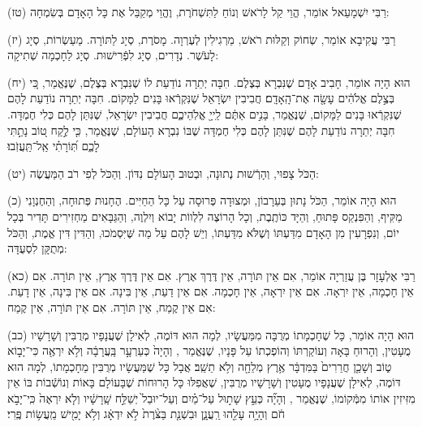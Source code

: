 \documentclass[twoside, openany, parskip=half, 11pt]{book}
\begin{document}
(טז)
רַבִּי יִשְׁמָעֵאל אוֹמֵר, הֱוֵי קַל לָרֹאשׁ וְנוֹחַ לַתִּשְׁחֹרֶת, וֶהֱוֵי מְקַבֵּל אֶת כָּל הָאָדָם בְּשִׂמְחָה:

(יז)
רַבִּי עֲקִיבָא אוֹמֵר, שְׂחוֹק וְקַלּוּת רֹאשׁ, מֵרְגִילִין לְעֶרְוָה.
מָסֹרֶת, סְיָג לַתּוֹרָה.
מַעַשְׂרוֹת, סְיָג לָעֹשֶׁר.
נְדָרִים, סְיָג לִפְֿרִישׁוּת.
סְיָג לַחָכְמָה שְׁתִיקָה:

(יח)
הוּא הָיָה אוֹמֵר, חָבִיב אָדָם שֶׁנִּבְרָא בְּצֶלֶם.
חִבָּה יְתֵרָה נוֹדַעַת לוֹ שֶׁנִּבְרָא בְּצֶלֶם, שֶׁנֶּאֱמַר, כִּ֚י בְּצֶ֣לֶם אֱלֹהִ֔ים עָשָׂ֖ה אֶת־הָֽאָדָֽם׃
חֲבִיבִין יִשְׂרָאֵל שֶׁנִּקְרְֿאוּ בָּנִים לַמָּקוֹם.
חִבָּה יְתֵרָה נוֹדַעַת לָהֶם שֶׁנִּקְרְֿאוּ בָּנִים לַמָּקוֹם, שֶׁנֶּאֱמַר, בָּנִ֣ים אַתֶּ֔ם לַֽייָ֖ אֱלֹֽהֵיכֶ֑ם
חֲבִיבִין יִשְׂרָאֵל, שֶׁנִּתַּן לָהֶם כְּלִי חֶמְדָּה.
חִבָּה יְתֵרָה נוֹדַעַת לָהֶם שֶׁנִּתַּן לָהֶם כְּלִי חֶמְדָּה שֶׁבּוֹ נִבְרָא הָעוֹלָם, שֶׁנֶּאֱמַר, כִּ֤י לֶ֣קַח ט֭וֹב נָתַ֣תִּי לָכֶ֑ם תּֽ֝וֹרָתִ֗י אַֽל־תַּֽעֲזֹֽבוּ׃

(יט)
הַכֹּל צָפוּי, וְהָרְֿשׁוּת נְתוּנָה, וּבְטוּב הָעוֹלָם נִדּוֹן.
וְהַכֹּל לְפִי רֹב הַמַּעֲשֶׂה:

(כ)
הוּא הָיָה אוֹמֵר, הַכֹּל נָתוּן בְּעֵרָבוֹן, וּמְצוּדָה פְּרוּסָה עַל כָּל הַחַיִּים.
הֶחָנוּת פְּתוּחָה, וְהַחֶנְוָנִי מַקִּיף, וְהַפִּנְקֵס פָּתוּחַ, וְהַיָּד כּוֹתֶֽבֶת, וְכָל הָרוֹצֶה לִלְווֹת יָבוֹא וְיִלְוֶה, וְהַגַּבָּאִים מַחְזִירִים תָּדִיר בְּכָל יוֹם, וְנִפְרָעִין מִן הָאָדָם מִדַּעְתּוֹ וְשֶׁלֹּא מִדַּעְתּוֹ, וְיֵשׁ לָהֶם עַל מַה שֶּׁיִּסְמֹכוּ, וְהַדִּין דִּין אֱמֶת, וְהַכֹּל מְתֻקָּן לִסְעֻדָּה:

(כא)
רַבִּי אֶלְעָזָר בֶּן עֲזַרְיָה אוֹמֵר, אִם אֵין תּוֹרָה, אֵין דֶּרֶךְ אֶרֶץ.
אִם אֵין דֶּרֶךְ אֶרֶץ, אֵין תּוֹרָה.
אִם אֵין חָכְמָה, אֵין יִרְאָה.
אִם אֵין יִרְאָה, אֵין חָכְמָה.
אִם אֵין דַעַת, אֵין בִּינָה.
אִם אֵין בִּינָה, אֵין דָעַת.
אִם אֵין קֶמַח, אֵין תּוֹרָה.
אִם אֵין תּוֹרָה, אֵין קֶמַח:

(כב)
הוּא הָיָה אוֹמֵר, כָּל שֶׁחָכְמָתוֹ מְרֻבָּה מִמַּעֲשָׂיו, לְמָה הוּא דּוֹמֶה, לְאִילָן שֶׁעֲנָפָיו מְרֻבִּין וְשָׁרָשָׁיו מֻעָטִין, וְהָרוּחַ בָּאָה וְעוֹקַרְתּוֹ וְהוֹפְכְתוֹ עַל פָּנָיו, שֶׁנֶּאֱמַר , וְהָיָה֙ כְּעַרְעָ֣ר בָּֽעֲרָבָ֔ה וְלֹ֥א יִרְאֶ֖ה כִּי־יָב֣וֹא ט֑וֹב וְשָׁכַ֤ן חֲרֵרִים֙ בַּמִּדְבָּ֔ר אֶ֥רֶץ מְלֵחָ֖ה וְלֹ֥א תֵשֵֽׁב׃
אֲבָל כָּל שֶׁמַּעֲשָׂיו מְרֻבִּין מֵחָכְמָתוֹ, לְמָה הוּא דּוֹמֶה, לְאִילָן שֶׁעֲנָפָיו מֻעָטִין וְשָׁרָשָׁיו מְרֻבִּין, שֶׁאֲפִלּוּ כָּל הָרוּחוֹת שֶׁבָּעוֹלָם בָּאוֹת וְנוֹשְֿׁבוֹת בּוֹ אֵין מִזִּיזִין אוֹתוֹ מִמְּֿקוֹמוֹ, שֶׁנֶּאֱמַר , וְהָיָ֞ה כְּעֵ֣ץ   שָׁת֣וּל עַל־מַ֗יִם וְעַל־יוּבַל֙ יְשַׁלַּ֣ח שָֽׁרָשָׁ֔יו וְלֹ֤א יִרְאֶה֙ כִּֽי־יָבֹ֣א חֹ֔ם וְהָיָ֥ה עָלֵ֖הוּ רַֽעֲנָ֑ן וּבִשְׁנַ֤ת בַּצֹּ֨רֶת֙ לֹ֣א יִדְאָ֔ג וְלֹ֥א יָמִ֖ישׁ מֵֽעֲשׂ֥וֹת פֶּֽרִי׃
\end{document}
